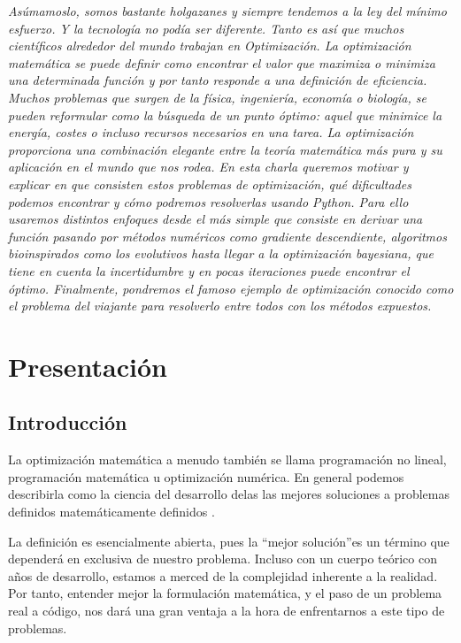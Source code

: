 \documentclass[runningheads]{llncs}
\begin{document}
	
	\textit{ As\'umamoslo, somos bastante holgazanes y siempre tendemos a la ley del mínimo esfuerzo. Y la tecnología no podía ser diferente. Tanto es así que muchos científicos alrededor del mundo trabajan en Optimización. La optimización matemática se puede definir como encontrar el valor que maximiza o minimiza una determinada función y por tanto responde a una definición de eficiencia. Muchos problemas que surgen de la física, ingeniería, economía o biología, se pueden reformular como la búsqueda de un punto óptimo: aquel que minimice la energía, costes o incluso recursos necesarios en una tarea. La optimización proporciona una combinación elegante entre la teoría matemática más pura y su aplicación en el mundo que nos rodea. En esta charla queremos motivar y explicar en que consisten estos problemas de optimización, qué dificultades podemos encontrar y cómo podremos resolverlas usando Python. Para ello usaremos distintos enfoques desde el más simple que consiste en derivar una función pasando por métodos numéricos como gradiente descendiente, algoritmos bioinspirados como los evolutivos hasta llegar a la optimización bayesiana, que tiene en cuenta la incertidumbre y en pocas iteraciones puede encontrar el óptimo. Finalmente, pondremos el famoso ejemplo de optimización conocido como el problema del viajante para resolverlo entre todos con los métodos expuestos.}

\section{Presentaci\'on}
\subsection{Introducción}
La optimización matemática a menudo también se llama programación no lineal, programación matemática u optimización numérica. En general podemos describirla como la ciencia del desarrollo delas  las mejores soluciones a problemas definidos matemáticamente definidos \cite{snyman2005practical}.

La definición es esencialmente abierta, pues la \textquotedblleft mejor solución\textquotedblright es un término que dependerá en exclusiva de nuestro problema. Incluso con un cuerpo teórico con años de desarrollo, estamos a merced de la complejidad inherente a la realidad. Por tanto, entender mejor la formulación matemática, y el paso de un problema real a código, nos dará una gran ventaja a la hora de enfrentarnos a este tipo de problemas.
\end{document}
